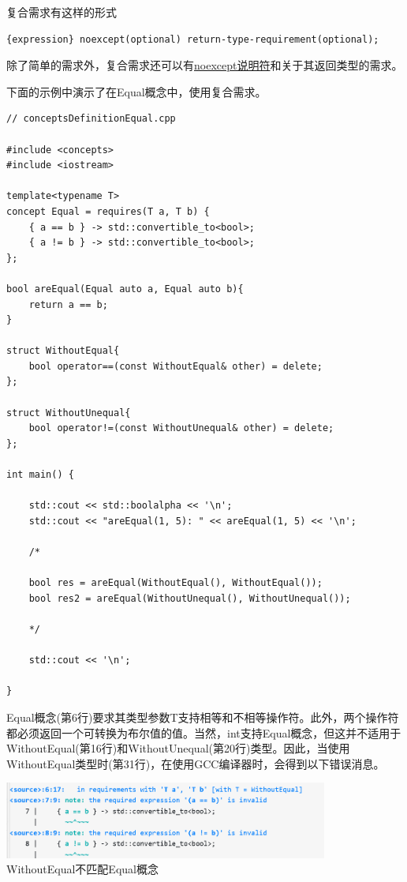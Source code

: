 复合需求有这样的形式

\begin{lstlisting}[style=styleCXX]
{expression} noexcept(optional) return-type-requirement(optional);
\end{lstlisting}

除了简单的需求外，复合需求还可以有\href{https://en.cppreference.com/w/cpp/language/noexcept_spec}{noexcept说明符}和关于其返回类型的需求。

下面的示例中演示了在Equal概念中，使用复合需求。

\begin{lstlisting}[style=styleCXX]
// conceptsDefinitionEqual.cpp

#include <concepts>
#include <iostream>

template<typename T>
concept Equal = requires(T a, T b) {
	{ a == b } -> std::convertible_to<bool>;
	{ a != b } -> std::convertible_to<bool>;
};

bool areEqual(Equal auto a, Equal auto b){
	return a == b;
}

struct WithoutEqual{
	bool operator==(const WithoutEqual& other) = delete;
};

struct WithoutUnequal{
	bool operator!=(const WithoutUnequal& other) = delete;
};

int main() {

	std::cout << std::boolalpha << '\n';
	std::cout << "areEqual(1, 5): " << areEqual(1, 5) << '\n';

	/*

	bool res = areEqual(WithoutEqual(), WithoutEqual());
	bool res2 = areEqual(WithoutUnequal(), WithoutUnequal());

	*/

	std::cout << '\n';

}
\end{lstlisting}

Equal概念(第6行)要求其类型参数T支持相等和不相等操作符。此外，两个操作符都必须返回一个可转换为布尔值的值。当然，int支持Equal概念，但这并不适用于WithoutEqual(第16行)和WithoutUnequal(第20行)类型。因此，当使用WithoutEqual类型时(第31行)，在使用GCC编译器时，会得到以下错误消息。

\begin{center}
\includegraphics[width=0.8\textwidth]{content/3/chapter4/images/1-4.png}\\
WithoutEqual不匹配Equal概念
\end{center}

